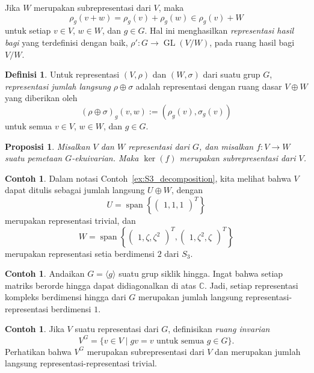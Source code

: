 \documentclass[12pt]{article}
\theoremstyle{plain}
\newtheorem{proposition}[theorem]{Proposisi}
\theoremstyle{definition}
\newtheorem{definition}[theorem]{Definisi}
\newtheorem{example}[theorem]{Contoh}
\theoremstyle{remark}
\numberwithin{equation}{section}
\begin{document}
Jika $W$ merupakan subrepresentasi dari $V$, maka
\[
\rho_g(v+w) = \rho_g(v) + \rho_g(w) \in \rho_g(v)+W
\]
untuk setiap $v \in V$, $w \in W$, dan $g \in G$.
Hal ini menghasilkan \emph{representasi hasil bagi} yang terdefinisi dengan baik,
$\rho' : G \to \operatorname{GL}(V/W)$,
pada ruang hasil bagi $V/W$.

\begin{definition}
Untuk representasi $(V,\rho)$ dan $(W,\sigma)$ dari suatu grup $G$,
\emph{representasi jumlah langsung} $\rho \oplus \sigma$
adalah representasi dengan ruang dasar $V \oplus W$ yang diberikan oleh
\[ (\rho \oplus \sigma)_g (v,w) := ( \rho_g(v), \sigma_g(v) ) \]
untuk semua $v \in V$, $w \in W$, dan $g \in G$.
\end{definition}

\begin{proposition}
Misalkan $V$ dan $W$ representasi dari $G$, dan misalkan
$f : V \to W$ suatu pemetaan $G$-ekuivarian.
Maka $\ker(f)$ merupakan subrepresentasi dari $V$.
\end{proposition}

\begin{example}
Dalam notasi
Contoh~\ref{ex:S3_decomposition}, kita melihat bahwa $V$ dapat ditulis
sebagai jumlah langsung $U \oplus W$, dengan
\[
U = \operatorname{span}\left\{ \begin{pmatrix} 1,1,1 \end{pmatrix}^T
\right\}
\]
merupakan representasi trivial, dan
\[
W = \operatorname{span}\left\{
\begin{pmatrix}1,\zeta,\zeta^2\end{pmatrix}^T,
\begin{pmatrix}1,\zeta^2,\zeta\end{pmatrix}^T
\right\}
\]
merupakan representasi setia berdimensi $2$ dari $S_3$.
\end{example}

\begin{example}
Andaikan $G=\langle g \rangle$ suatu grup siklik hingga.
Ingat bahwa setiap matriks berorde hingga dapat didiagonalkan
di atas $\mathbb{C}$.
Jadi, setiap representasi kompleks berdimensi hingga dari
$G$ merupakan jumlah langsung representasi-representasi berdimensi $1$.
\end{example}

\begin{example}
Jika $V$ suatu representasi dari $G$, definisikan \emph{ruang invarian}
\[
V^G = \{ v \in V \mid gv=v \textrm{ untuk semua } g \in G \}.
\]
Perhatikan bahwa $V^G$ merupakan subrepresentasi dari $V$ dan merupakan jumlah langsung
representasi-representasi trivial.
\end{example}
\end{document}
